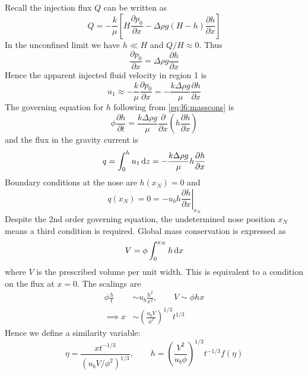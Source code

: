 \documentclass{jknotes}
\begin{document}
Recall the injection flux $Q$ can be written as
\begin{equation}
	Q = -\frac{k}{\mu}\left[ H \frac{\partial p_0}{\partial  x} - \Delta \rho g
	(H-h)\frac{\partial h}{\partial x} \right]
\end{equation}
In the unconfined limit we have $h \ll H$ and $Q/H \approx 0$. Thus
\begin{equation}
	\frac{\partial p_0}{\partial x} = \Delta \rho g \frac{\partial h}{\partial
	x}
\end{equation}
Hence the apparent injected fluid velocity in region 1 is
\begin{equation}
	u_1 \approx -\frac{k}{\mu} \frac{\partial p_0}{\partial x} = -\frac{k
	\Delta \rho g}{\mu} \frac{\partial h}{\partial x}
\end{equation}
The governing equation for $h$ following from \eqref{eq:l6:masscons} is
\begin{equation}
	\phi \frac{\partial h}{\partial t} = \frac{k \Delta \rho
	g}{\mu}\frac{\partial}{\partial x} \left( h \frac{\partial h}{\partial
	x}\right)
\end{equation}
and the flux in the gravity current is
\begin{equation}
	q = \int_0^h u_1 \, \diffd z = -\frac{k\Delta \rho g}{\mu} h
	\frac{\partial h}{\partial x}
\end{equation}
Boundary conditions at the nose are $h(x_N) = 0$ and 
\begin{equation}
	q(x_N) = 0 = - u_b h \left.\frac{\partial h}{\partial x}\right|_{x_N}
\end{equation}
Despite the 2nd order governing equation, the undetermined nose position $x_N$
means a third condition is required. Global mass conservation is expressed as
\begin{equation}
	V = \phi \int_0^{x_N} h \, \diffd x
\end{equation}
where $V$ is the prescribed volume per unit width. This is equivalent to a
condition on the flux at $x=0$. The scalings are
\begin{align}
	\phi \frac{h}{t} &\sim u_b \frac{h^2}{x^2}, \hspace{2em} V \sim \phi h
	x \\
	\implies x &\sim  \left(\frac{u_b V}{\phi^2}\right)^{1/3} t^{1/3}
\end{align}
Hence we define a similarity variable:
\begin{equation}
	\eta = \frac{x t^{-1/3}}{(u_b V/\phi^2)^{1/3}}, \hspace{2em} h = \left(
	\frac{V^2}{u_b \phi}\right)^{1/3} t^{-1/3} f(\eta)
\end{equation}
\end{document}
